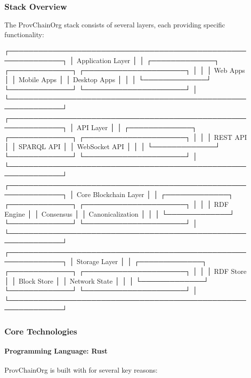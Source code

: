 \documentclass[letterpaper,10pt,english]{sphinxmanual}
\begin{document}
\subsubsection{Stack Overview}
\label{\detokenize{stack/intro-to-stack:stack-overview}}
\sphinxAtStartPar
The ProvChainOrg stack consists of several layers, each providing specific functionality:

\begin{sphinxVerbatim}[commandchars=\\\{\}]
┌─────────────────────────────────────────────────────────────┐
│                    Application Layer                        │
│  ┌─────────────┐  ┌─────────────┐  ┌─────────────────────┐ │
│  │ Web Apps    │  │ Mobile Apps │  │ Desktop Apps        │ │
│  └─────────────┘  └─────────────┘  └─────────────────────┘ │
└─────────────────────────────────────────────────────────────┘
┌─────────────────────────────────────────────────────────────┐
│                      API Layer                              │
│  ┌─────────────┐  ┌─────────────┐  ┌─────────────────────┐ │
│  │ REST API    │  │ SPARQL API  │  │ WebSocket API       │ │
│  └─────────────┘  └─────────────┘  └─────────────────────┘ │
└─────────────────────────────────────────────────────────────┘
┌─────────────────────────────────────────────────────────────┐
│                   Core Blockchain Layer                     │
│  ┌─────────────┐  ┌─────────────┐  ┌─────────────────────┐ │
│  │ RDF Engine  │  │ Consensus   │  │ Canonicalization    │ │
│  └─────────────┘  └─────────────┘  └─────────────────────┘ │
└─────────────────────────────────────────────────────────────┘
┌─────────────────────────────────────────────────────────────┐
│                    Storage Layer                            │
│  ┌─────────────┐  ┌─────────────┐  ┌─────────────────────┐ │
│  │ RDF Store   │  │ Block Store │  │ Network State       │ │
│  └─────────────┘  └─────────────┘  └─────────────────────┘ │
└─────────────────────────────────────────────────────────────┘
\end{sphinxVerbatim}


\subsubsection{Core Technologies}
\label{\detokenize{stack/intro-to-stack:core-technologies}}

\paragraph{Programming Language: Rust}
\label{\detokenize{stack/intro-to-stack:programming-language-rust}}
\sphinxAtStartPar
ProvChainOrg is built with  for several key reasons:
\end{document}
